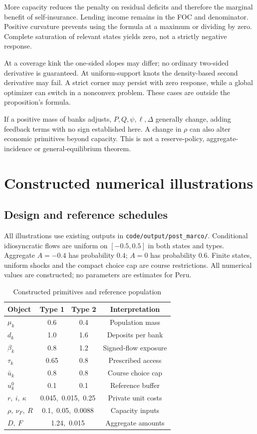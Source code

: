 \documentclass[11pt]{article}
\theoremstyle{definition}
\begin{document}
More capacity reduces the penalty on residual deficits and therefore the marginal benefit of self-insurance. Lending income remains in the FOC and denominator. Positive curvature prevents using the formula at a maximum or dividing by zero. Complete saturation of relevant states yields zero, not a strictly negative response.

At a coverage kink the one-sided slopes may differ; no ordinary two-sided derivative is guaranteed. At uniform-support knots the density-based second derivative may fail. A strict corner may persist with zero response, while a global optimizer can switch in a nonconvex problem. These cases are outside the proposition's formula.

If a positive mass of banks adjusts, $P,Q,\psi,\ell,\Delta$ generally change, adding feedback terms with no sign established here. A change in $\rho$ can also alter economic primitives beyond capacity. This is not a reserve-policy, aggregate-incidence or general-equilibrium theorem.

\section{Constructed numerical illustrations}\label{sec:numerics}
\subsection{Design and reference schedules}
All illustrations use existing outputs in \texttt{code/output/post\_marco/}. Conditional idiosyncratic flows are uniform on $[-0.5,0.5]$ in both states and types. Aggregate $A=-0.4$ has probability $0.4$; $A=0$ has probability $0.6$. Finite states, uniform shocks and the compact choice cap are course restrictions. All numerical values are constructed; no parameters are estimates for Peru.

\begin{table}[htbp]
\centering
\caption{Constructed primitives and reference population}\label{tab:params}
\begin{tabular}{lccc}
\toprule
Object & Type 1 & Type 2 & Interpretation\\
\midrule
$\mu_k$ & 0.6 & 0.4 & Population mass\\
$d_k$ & 1.0 & 1.6 & Deposits per bank\\
$\beta_k$ & 0.8 & 1.2 & Signed-flow exposure\\
$\tau_k$ & 0.65 & 0.8 & Prescribed access\\
$\bar u_k$ & 0.8 & 0.8 & Course choice cap\\
$u_k^0$ & 0.1 & 0.1 & Reference buffer\\
\midrule
$r,\ i,\ \kappa$ & \multicolumn{2}{c}{0.045,\ 0.015,\ 0.25} & Private unit costs\\
$\rho,\ \nu_F,\ R$ & \multicolumn{2}{c}{0.1,\ 0.05,\ 0.0088} & Capacity inputs\\
$D,\ F$ & \multicolumn{2}{c}{1.24,\ 0.015} & Aggregate amounts\\
\bottomrule
\end{tabular}
\end{table}
\end{document}
